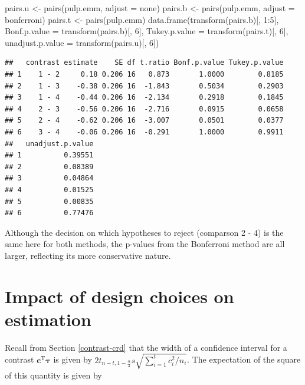 \documentclass[
]{book}
\newenvironment{Shaded}{\begin{snugshade}}{\end{snugshade}}
\newcommand{\AttributeTok}[1]{\textcolor[rgb]{0.77,0.63,0.00}{#1}}
\newcommand{\DecValTok}[1]{\textcolor[rgb]{0.00,0.00,0.81}{#1}}
\newcommand{\FunctionTok}[1]{\textcolor[rgb]{0.00,0.00,0.00}{#1}}
\newcommand{\NormalTok}[1]{#1}
\newcommand{\OtherTok}[1]{\textcolor[rgb]{0.56,0.35,0.01}{#1}}
\newcommand{\SpecialCharTok}[1]{\textcolor[rgb]{0.00,0.00,0.00}{#1}}
\newcommand{\StringTok}[1]{\textcolor[rgb]{0.31,0.60,0.02}{#1}}
\theoremstyle{definition}
\theoremstyle{definition}
\theoremstyle{definition}
\theoremstyle{definition}
\theoremstyle{remark}
\begin{document}
\begin{Shaded}
\begin{Highlighting}[]
\NormalTok{pairs.u }\OtherTok{\textless{}{-}} \FunctionTok{pairs}\NormalTok{(pulp.emm, }\AttributeTok{adjust =} \StringTok{\textquotesingle{}none\textquotesingle{}}\NormalTok{)}
\NormalTok{pairs.b }\OtherTok{\textless{}{-}} \FunctionTok{pairs}\NormalTok{(pulp.emm, }\AttributeTok{adjust =} \StringTok{\textquotesingle{}bonferroni\textquotesingle{}}\NormalTok{)}
\NormalTok{pairs.t }\OtherTok{\textless{}{-}} \FunctionTok{pairs}\NormalTok{(pulp.emm)}
\FunctionTok{data.frame}\NormalTok{(}\FunctionTok{transform}\NormalTok{(pairs.b)[, }\DecValTok{1}\SpecialCharTok{:}\DecValTok{5}\NormalTok{], }\AttributeTok{Bonf.p.value =} \FunctionTok{transform}\NormalTok{(pairs.b)[, }\DecValTok{6}\NormalTok{], }\AttributeTok{Tukey.p.value =} \FunctionTok{transform}\NormalTok{(pairs.t)[, }\DecValTok{6}\NormalTok{], }\AttributeTok{unadjust.p.value =} \FunctionTok{transform}\NormalTok{(pairs.u)[, }\DecValTok{6}\NormalTok{])}
\end{Highlighting}
\end{Shaded}

\begin{verbatim}
##   contrast estimate    SE df t.ratio Bonf.p.value Tukey.p.value
## 1    1 - 2     0.18 0.206 16   0.873       1.0000        0.8185
## 2    1 - 3    -0.38 0.206 16  -1.843       0.5034        0.2903
## 3    1 - 4    -0.44 0.206 16  -2.134       0.2918        0.1845
## 4    2 - 3    -0.56 0.206 16  -2.716       0.0915        0.0658
## 5    2 - 4    -0.62 0.206 16  -3.007       0.0501        0.0377
## 6    3 - 4    -0.06 0.206 16  -0.291       1.0000        0.9911
##   unadjust.p.value
## 1          0.39551
## 2          0.08389
## 3          0.04864
## 4          0.01525
## 5          0.00835
## 6          0.77476
\end{verbatim}

Although the decision on which hypotheses to reject (comparson 2 - 4) is the same here for both methods, the p-values from the Bonferroni method are all larger, reflecting its more conservative nature.

\hypertarget{impact-of-design-choices-on-estimation}{%
\section{Impact of design choices on estimation}\label{impact-of-design-choices-on-estimation}}

Recall from Section \ref{contrast-crd} that the width of a confidence interval for a contrast \(\boldsymbol{c}^{\mathrm{T}}\boldsymbol{\tau}\) is given by \(2t_{n-t, 1-\frac{\alpha}{2}}s\sqrt{\sum_{i=1}^tc_i^2/n_i}\). The expectation of the square of this quantity is given by
\end{document}
